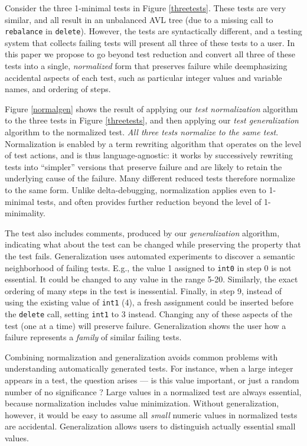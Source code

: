 Consider the three 1-minimal tests in Figure
\ref{threetests}.  These tests are very similar, and all result
in an unbalanced AVL tree (due to a missing call to {\tt rebalance} in
{\tt delete}).  However, the tests are syntactically different,
and a testing system that collects failing tests will present all
three of these tests to a user.  In this paper we propose to go beyond test reduction
and convert all three of these
tests into a single, \emph{normalized} form that preserves failure
while deemphasizing accidental aspects of each test, such as
particular integer values and variable names, and ordering of steps.

Figure \ref{normalgen} shows the result of applying our \emph{test
  normalization} algorithm to the three tests in Figure
\ref{threetests}, and then applying our \emph{test
  generalization} algorithm to the normalized test.  \emph{All
  three tests normalize to the same test}.  Normalization is
enabled by a term rewriting algorithm \cite{term2,term1} that operates
on the level of test actions, and is thus language-agnostic:
it works by successively rewriting tests into ``simpler''
versions that preserve failure and are likely to retain the
underlying cause of the failure. Many
different reduced tests therefore normalize to the same form.
Unlike delta-debugging, normalization applies even to 1-minimal tests,
and often provides further reduction beyond the level of 1-minimality.

The test also includes comments, produced by our
\emph{generalization} \cite{SmartCheck} algorithm, indicating what
about the test can be changed while preserving the property that
the test fails.  Generalization uses automated experiments to discover
a semantic neighborhood of failing tests.  E.g.,
the value 1 assigned to {\tt int0} in step 0 is not essential.  It
could be changed to any value in the range 5-20.  Similarly, the exact ordering of many steps in the test
is inessential.  Finally, in step 9, instead of using the existing
value of {\tt int1} (4), a fresh assignment could be inserted before
the {\tt delete} call, setting {\tt int1} to 3 instead.  Changing any
of these aspects of the test (one at a time)
will preserve failure.  Generalization shows 
the user how a failure represents  a
\emph{family} of similar failing tests.

Combining normalization and generalization avoids common problems
with understanding automatically generated tests.  For instance,
when a large integer appears in a test, the question
arises --- is this value important, or just a random number of
no significance \cite{MakeMost}?  Large
values in a normalized test are always essential, because normalization includes value minimization.
Without generalization, however, it would be
easy to assume all \emph{small} numeric values in normalized
tests are accidental.  Generalization allows users to
distinguish actually essential small values.

